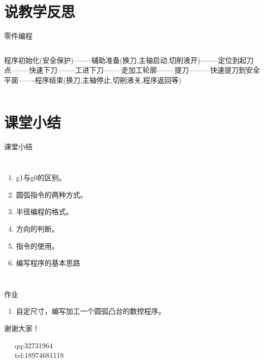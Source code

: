 \documentclass[utf8,zihao=-4]{ctexbeamer}
\begin{document}
\section{说教学反思}
\begin{frame}{零件编程}
    \begin{columns}
        \column{\textwidth}
 程序初始化(安全保护)--------辅助准备(换刀,主轴启动,切削液开)--------定位到起刀点--------快速下刀--------工进下刀--------走加工轮廓--------提刀---------快速提刀到安全平面-------程序结束(换刀,主轴停止,切削液关,程序返回等)       
        
    \end{columns}
\end{frame}



\section*{课堂小结}
\begin{frame}{课堂小结}

    \begin{columns}
\begin{enumerate}[<+-> ]
\item g1与g0的区别。
\item 圆弧指令的两种方式。
\item 半径编程的格式。
\item 方向的判断。
\item 指令的使用。
\item 编写程序的基本思路
\end{enumerate}
    \end{columns}
\end{frame}

\begin{frame}{作业}
\begin{enumerate}
    \item 自定尺寸，编写加工一个圆弧凸台的数控程序。
\end{enumerate}
\end{frame}

\begin{frame}[plain]
\vfill

\centering \huge 谢谢大家！

\vfill

\flushleft \footnotesize   
~~~qq:32731964\\
~~~tel:18974681118\\

\end{frame}
\end{document}
